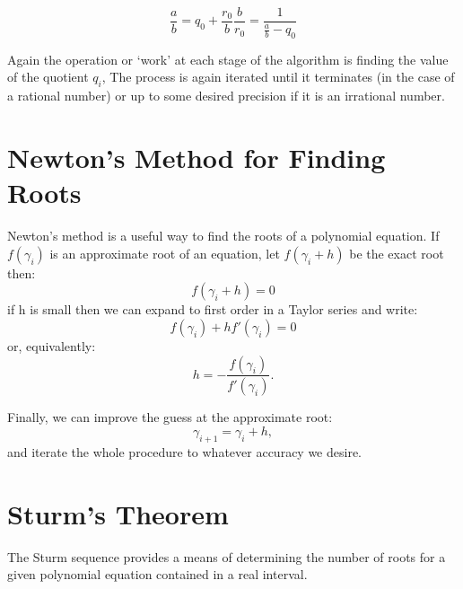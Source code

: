 \begin{equation}
\frac{a}{b} = q_{0} + \frac{r_{0}}{b}
\frac{b}{r_{0}} = \frac{1}{\frac{a}{b} - q_{0}}
\end{equation}

Again the operation or `work' at each stage of the algorithm
is finding the value of the quotient $q_i$, The process
is again iterated until it terminates (in the case of a rational number)
or up to some desired precision if it is an irrational number.


\section{Newton's Method for Finding Roots}
Newton's method is a useful way to find the roots of a polynomial
equation. If $f(\gamma_i)$ is an approximate root of an equation,
let $f(\gamma_i+h)$ be the exact root then:
%
\begin{equation}
f(\gamma_i+h)=0
\end{equation}
%
if h is small then we can expand to first order in a 
Taylor series and write:
\begin{equation}
f(\gamma_i) + h f'(\gamma_{i})= 0
\end{equation}
%
or, equivalently:
%
\begin{equation}
h = -\frac{f(\gamma_{i})}{f'(\gamma_i)}.
\end{equation}

Finally, we can improve the guess at the approximate root:
%
\begin{equation}
\gamma_{i+1} =  \gamma_{i} + h,
\end{equation}
%
and iterate the whole procedure to whatever accuracy we desire.

\section{Sturm's Theorem}
The Sturm sequence provides a means of determining the number of 
roots for a given polynomial equation contained in a real interval.

